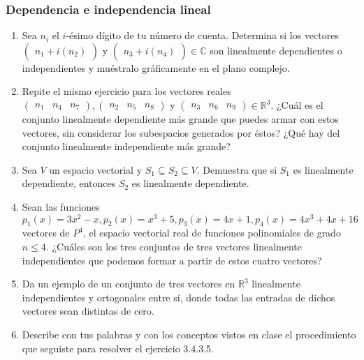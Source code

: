 \documentclass[apuntes]{subfiles}
\begin{document}
\subsubsection*{Dependencia e independencia lineal}

\begin{enumerate}
    \item Sea $n_i$ el $i$-ésimo dígito de tu número de cuenta. Determina si los vectores $\begin{pmatrix} n_1 + i(n_2) \end{pmatrix}$ y $\begin{pmatrix} n_3 + i(n_4) \end{pmatrix} \in \mathbb{C}$ son linealmente dependientes o independientes y muéstralo gráficamente en el plano complejo. 
    \item Repite el mismo ejercicio para los vectores reales $\begin{pmatrix} n_1 & n_4 & n_7 \end{pmatrix}, \begin{pmatrix} n_2 & n_5 & n_8 \end{pmatrix}$ y $\begin{pmatrix} n_3 & n_6 & n_9 \end{pmatrix}\in\mathbb{R}^3.$ ¿Cuál es el conjunto linealmente dependiente más grande que puedes armar con estos vectores, sin considerar los subespacios generados por éstos? ¿Qué hay del conjunto linealmente independiente más grande? 
    \item Sea $V$ un espacio vectorial y $S_1\subseteq S_2\subseteq V$. Demuestra que si $S_1$ es linealmente dependiente, entonces $S_2$ es linealmente dependiente. 
    \item Sean las funciones $p_1(x) = 3x^2-x, p_2(x) = x^3+5, p_3(x)=4x+1, p_4(x)=4x^3+4x+16$ vectores de $P^4$, el espacio vectorial real de funciones polinomiales de grado $n\le 4.$ ¿Cuáles son los tres conjuntos de tres vectores linealmente independientes que podemos formar a partir de estos cuatro vectores?  
    \item Da un ejemplo de un conjunto de tres vectores en $\mathbb{R}^3$ linealmente independientes y ortogonales entre sí, donde todas las entradas de dichos vectores sean distintas de cero.
    \item Describe con tus palabras y con los conceptos vistos en clase el procedimiento que seguiste para resolver el ejercicio 3.4.3.5.
    
\end{enumerate}
\end{document}
